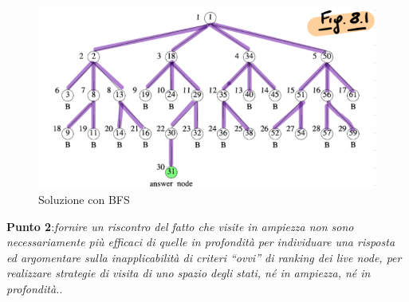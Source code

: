 \documentclass[a4paper]{article}
\begin{document}
\begin{itemize}
		\begin{figure}[!ht]
\centering
\includegraphics[width=1\textwidth]{./img/C_2_BFS.png}
\caption{Soluzione con BFS} \label{FIG:C_2_BFS}
\end{figure}
\end{itemize}
\textbf{Punto 2}:\emph{fornire un riscontro del fatto che visite in ampiezza non sono necessariamente più efficaci di quelle in profondità per individuare una risposta ed argomentare sulla inapplicabilità di criteri “ovvi” di ranking dei live node, per realizzare strategie di visita di uno spazio degli stati, né in ampiezza, né in profondità.}.
\end{document}
